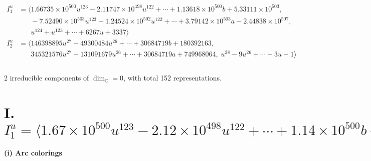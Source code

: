 \documentclass[1p]{elsarticle_modified}
\theoremstyle{definition}
\begin{document}
\begin{align*}
I^u_{1}&=\langle 
1.66735\times10^{500} u^{123}-2.11747\times10^{498} u^{122}+\cdots+1.13618\times10^{500} b+5.33111\times10^{503},\\
\phantom{I^u_{1}}&\phantom{= \langle  }-7.52490\times10^{503} u^{123}-1.24524\times10^{502} u^{122}+\cdots+3.79142\times10^{503} a-2.44838\times10^{507},\\
\phantom{I^u_{1}}&\phantom{= \langle  }u^{124}+u^{123}+\cdots+6267 u+3337\rangle \\
I^u_{2}&=\langle 
146398895 u^{27}-49300484 u^{26}+\cdots+30684719 b+180392163,\\
\phantom{I^u_{2}}&\phantom{= \langle  }345321576 u^{27}-131091679 u^{26}+\cdots+30684719 a+749968064,\;u^{28}-9 u^{26}+\cdots+3 u+1\rangle \\
\\
\end{align*}
\raggedright * 2 irreducible components of $\dim_{\mathbb{C}}=0$, with total 152 representations.\\
\newpage
\renewcommand{\arraystretch}{1}
\centering \section*{I. $I^u_{1}= \langle 1.67\times10^{500} u^{123}-2.12\times10^{498} u^{122}+\cdots+1.14\times10^{500} b+5.33\times10^{503},\;-7.52\times10^{503} u^{123}-1.25\times10^{502} u^{122}+\cdots+3.79\times10^{503} a-2.45\times10^{507},\;u^{124}+u^{123}+\cdots+6267 u+3337 \rangle$}
\flushleft \textbf{(i) Arc colorings}\\
\end{document}
